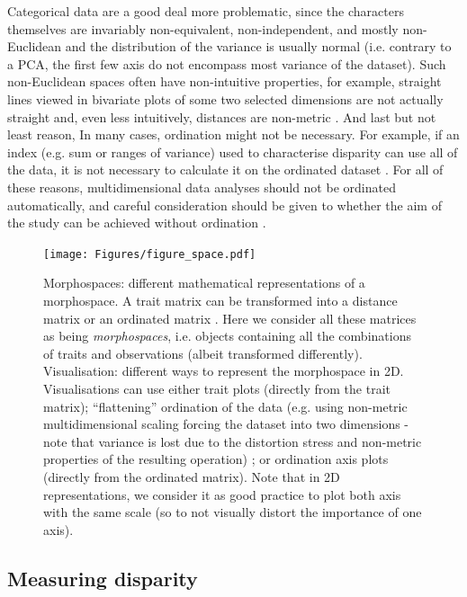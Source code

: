 \documentclass[12pt,letterpaper]{article}
\begin{document}
Categorical data are a good deal more problematic, since the characters themselves are invariably non-equivalent, non-independent, and mostly non-Euclidean and the distribution of the variance is usually normal (i.e. contrary to a PCA, the first few axis do not encompass most variance of the dataset).
Such non-Euclidean spaces often have non-intuitive properties, for example, straight lines viewed in bivariate plots of some two selected dimensions are not actually straight and, even less intuitively, distances are non-metric \citep[i.e. the distance between A and B is not equal to the distance between B and A][]{Gerber2014-ol}.
And last but not least reason, In many cases, ordination might not be necessary.
For example, if an index (e.g. sum or ranges of variance) used to characterise disparity can use all of the data, it is not necessary to calculate it on the ordinated dataset \citep{Close2015-qi}.
For all of these reasons, multidimensional data analyses should not be ordinated automatically, and careful consideration should be given to whether the aim of the study can be achieved without ordination \citep{lloyd2016,lloyd2018}.


\begin{figure}[!htbp]
\centering
   \texttt{[image: Figures/figure\_space.pdf]}
\caption{
    \tiny{
    Morphospaces: different mathematical representations of a morphospace.
    A trait matrix can be transformed into a distance matrix \citep[e.g in][]{Close2015-qi} or an ordinated matrix \citep[e.g. in][]{Brusatte2008-vx}.
    Here we consider all these matrices as being \textit{morphospaces}, i.e. objects containing all the combinations of traits and observations (albeit transformed differently).
    Visualisation: different  ways to represent the morphospace in 2D.
    Visualisations can use either trait plots (directly from the trait matrix); ``flattening'' ordination of the data (e.g. using non-metric multidimensional scaling forcing the dataset into two dimensions - note that variance is lost due to the distortion stress and non-metric properties of the resulting operation) ; or ordination axis plots (directly from the ordinated matrix).
    Note that in 2D representations, we consider it as good practice to plot both axis with the same scale (so to not visually distort the importance of one axis).
    }
}
\label{Fig:morphospace}
\end{figure}

\subsection{Measuring disparity} \label{section:metrics}
\end{document}
